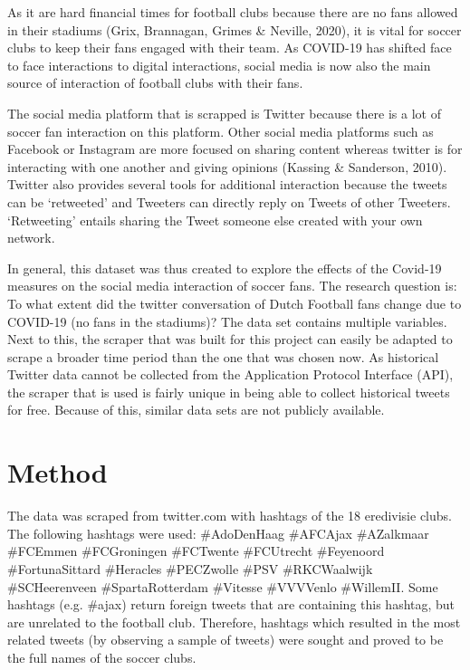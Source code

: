 \documentclass[12pt]{article}
\begin{document}
As it are hard financial times for football clubs because there are no fans allowed in their stadiums (Grix, Brannagan, Grimes \& Neville, 2020), it is vital for soccer clubs to keep their fans engaged with their team. As COVID-19 has shifted face to face interactions to digital interactions, social media is now also the main source of interaction of football clubs with their fans.

The social media platform that is scrapped is Twitter because there is a lot of soccer fan interaction on this platform. Other social media platforms such as Facebook or Instagram are more focused on sharing content whereas twitter is for interacting with one another and giving opinions (Kassing \& Sanderson, 2010). Twitter also provides several tools for additional interaction because the tweets can be ‘retweeted’ and Tweeters can directly reply on Tweets of other Tweeters. ‘Retweeting’ entails sharing the Tweet someone else created with your own network. 

In general, this dataset was thus created to explore the effects of the Covid-19 measures on the social media interaction of soccer fans. The research question is: To what extent did the twitter conversation of Dutch Football fans change due to COVID-19 (no fans in the stadiums)? The data set contains multiple variables. Next to this, the scraper that was built for this project can easily be adapted to scrape a broader time period than the one that was chosen now. As historical Twitter data cannot be collected from the Application Protocol Interface (API), the scraper that is used is fairly unique in being able to collect historical tweets for free. Because of this, similar data sets are not publicly available. 

\section{Method}
The data was scraped from twitter.com with hashtags of the 18 eredivisie clubs.  The following hashtags were used: \#AdoDenHaag \#AFCAjax \#AZalkmaar \#FCEmmen \#FCGroningen \#FCTwente \#FCUtrecht \#Feyenoord \#FortunaSittard \#Heracles \#PECZwolle \#PSV \#RKCWaalwijk \#SCHeerenveen \#SpartaRotterdam \#Vitesse \#VVVVenlo \#WillemII. Some hashtags (e.g. \#ajax) return foreign tweets that are containing this hashtag, but are unrelated to the football club. Therefore, hashtags which resulted in the most related tweets (by observing a sample of tweets) were sought and proved to be the full names of the soccer clubs.
\end{document}
